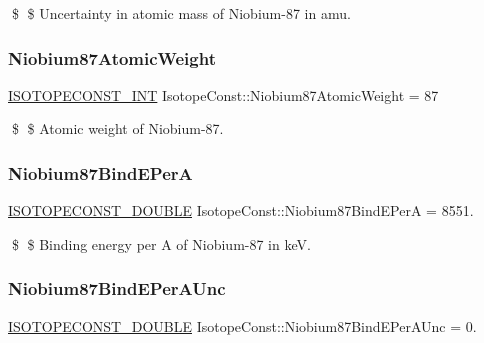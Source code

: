 \$ \$ Uncertainty in atomic mass of Niobium-\/87 in amu. \mbox{\label{group___isotope_const-_niobium-_nb87_ga6d6a3d2988fdf93fc96b8a2e4680356d}} 
\subsubsection{\texorpdfstring{Niobium87\+Atomic\+Weight}{Niobium87AtomicWeight}}
{\footnotesize\ttfamily \mbox{\hyperlink{group___isotope_const-_macros_ga5f18360b3e99483a35c32d789e62621c}{I\+S\+O\+T\+O\+P\+E\+C\+O\+N\+S\+T\+\_\+\+I\+NT}} Isotope\+Const\+::\+Niobium87\+Atomic\+Weight = 87}

\$ \$ Atomic weight of Niobium-\/87. \mbox{\label{group___isotope_const-_niobium-_nb87_ga90d5302539fcb7104f320894681b7db8}} 
\subsubsection{\texorpdfstring{Niobium87\+Bind\+E\+PerA}{Niobium87BindEPerA}}
{\footnotesize\ttfamily \mbox{\hyperlink{group___isotope_const-_macros_ga8f45a7272ce02c0b4c65c44636ed719a}{I\+S\+O\+T\+O\+P\+E\+C\+O\+N\+S\+T\+\_\+\+D\+O\+U\+B\+LE}} Isotope\+Const\+::\+Niobium87\+Bind\+E\+PerA = 8551.}

\$ \$ Binding energy per A of Niobium-\/87 in keV. \mbox{\label{group___isotope_const-_niobium-_nb87_ga2a13304c73a4372d5f48d94cd84ed402}} 
\subsubsection{\texorpdfstring{Niobium87\+Bind\+E\+Per\+A\+Unc}{Niobium87BindEPerAUnc}}
{\footnotesize\ttfamily \mbox{\hyperlink{group___isotope_const-_macros_ga8f45a7272ce02c0b4c65c44636ed719a}{I\+S\+O\+T\+O\+P\+E\+C\+O\+N\+S\+T\+\_\+\+D\+O\+U\+B\+LE}} Isotope\+Const\+::\+Niobium87\+Bind\+E\+Per\+A\+Unc = 0.}

